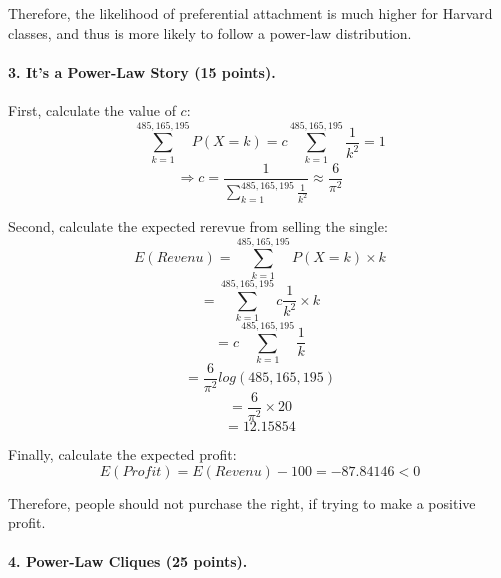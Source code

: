\documentclass[11pt]{article} %
\begin{document}
Therefore, the likelihood of preferential attachment is much higher for Harvard classes, and thus is more likely to follow a power-law distribution.








\paragraph{3. It's a Power-Law Story (15 points).}

First, calculate the value of $c$: 
$$\sum_{k=1}^{485,165,195} P(X=k) =c \sum_{k=1}^{485,165,195} \frac{1}{k^2} =1 $$
$$\Rightarrow c=\frac{1}{\sum_{k=1}^{485,165,195} \frac{1}{k^2}} \approx \frac{6}{\pi^2}$$
 

Second, calculate the expected rerevue from selling the single:
$$E(Revenu) =\sum_{k=1}^{485,165,195} P(X=k) \times k  $$
$$ =\sum_{k=1}^{485,165,195} c \frac{1}{k^2} \times k $$
$$ =c \sum_{k=1}^{485,165,195} \frac{1}{k}$$
$$ = \frac{6}{\pi^2} log(485,165,195)$$
 $$= \frac{6}{\pi^2} \times 20 $$
$$ =12.15854 $$

Finally, calculate the expected profit: 
$$ E(Profit) = E(Revenu) - 100 = -87.84146 <  0 $$

Therefore, people should not purchase the right, if trying to make a positive profit.








\paragraph{4. Power-Law Cliques (25 points).}
\end{document}
